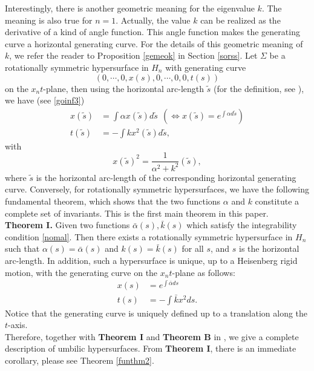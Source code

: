 \documentclass[12pt]{amsart}
\theoremstyle{definition}\newtheorem{exa}[thm]{\sc Example}
\theoremstyle{definition}\newtheorem{de}[thm]{\sc Definition}
\theoremstyle{definition}\newtheorem{rem}[thm]{\sc Remark}
\theoremstyle{definition}\newtheorem{prob}[thm]{\it Problem}
\theoremstyle{definition}\newtheorem{fact}[thm]{\sc Fact}
\theoremstyle{definition}\newtheorem{claim}[thm]{\sc Claim}
\numberwithin{equation}{section}
\begin{document}
Interestingly, there is another geometric meaning for the eigenvalue $k$. The meaning is also true for $n=1$. Actually, the value $k$ can be realized as the derivative of a kind of angle function. This angle function makes the generating curve a horizontal generating curve. For the details of this geometric meaning of $k$, we refer the reader to Proposition \ref{gemeok} in Section \ref{sorss}. Let $\Sigma$ be a rotationally symmetric hypersurface in $H_{n}$ with generating curve 
\[(0,\cdots,0,x(s),0,\cdots,0,0,t(s)) \] on the $x_{n}t$-plane, then using the horizontal arc-length $\tilde{s}$ (for the definition, see \cite{CFH,CHL}), we have (see \eqref{goinf3})
\begin{equation*}
\begin{split}
x(\tilde{s})&=\int \alpha x(\tilde{s})d\tilde{s}\ \ \left(\Leftrightarrow x(\tilde{s})=e^{\int\alpha d\tilde{s}}\right)\\
t(\tilde{s})&=-\int kx^2(\tilde{s})d\tilde{s},
\end{split}
\end{equation*}
with \[x(\tilde{s})^{2}=\frac{1}{\alpha^2+k^{2}}(\tilde{s}),\] where $\tilde{s}$ is the horizontal arc-length of the corresponding horizontal generating curve.
Conversely, for rotationally symmetric hypersurfaces, we have the following fundamental theorem, which shows that the two functions $\alpha$ and $k$ constitute a complete set of invariants. This is the first main theorem in this paper.\\

{\bf Theorem I.}
Given two functions $\bar\alpha(s),\bar{k}(s)$ which satisfy the integrability condition \eqref{nomal}.
Then there exists a rotationally symmetric hypersurface in $H_{n}$ such that $\alpha(s)=\bar\alpha(s)$ and $k(s)=\bar k(s)$ for all $s$, and $s$ is the horizontal arc-length. In addition, such a hypersurface is unique, up to a Heisenberg rigid motion, with the generating curve  on the $x_{n}t$-plane as follows:
\begin{equation*}
\begin{split}
x(s)&=e^{\int\bar\alpha ds}\\
t(s)&=-\int \bar{k}x^2 ds.
\end{split}
\end{equation*}
Notice that the generating curve is uniquely defined up to a translation along the $t$-axis.\\

Therefore, together with {\bf Theorem I} and {\bf Theorem B} in \cite{CCHY2}, we give a complete description of umbilic hypersurfaces.
From {\bf Theorem I}, there is an immediate corollary, please see Theorem \ref{funthm2}.\\
 
\end{document}
